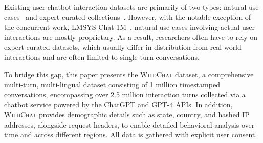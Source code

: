 \documentclass{article} %
\newcommand{\corpus}{\textsc{WildChat}\xspace}
\begin{document}
Existing user-chatbot interaction datasets are primarily of two types: natural use cases~\citep{zheng2024realchatm} and expert-curated collections~\citep{alpaca,wang2022supernaturalinstructions}. However, with the notable exception of the concurrent work, LMSYS-Chat-1M~\citep{zheng2024realchatm}, natural use cases involving actual user interactions are mostly proprietary. 
As a result, researchers often have to rely on expert-curated datasets, which usually differ in distribution from real-world interactions and are often limited to single-turn conversations.


To bridge this gap, this paper presents the \corpus dataset, a comprehensive multi-turn, multi-lingual dataset consisting of 1 million timestamped conversations, encompassing over 2.5 million interaction turns collected via a chatbot service powered by the ChatGPT and GPT-4 APIs. In addition, \corpus provides demographic details such as state, country, and hashed IP addresses, alongside request headers, to enable detailed behavioral analysis over time and across different regions. All data is gathered with explicit user consent.


\end{document}
